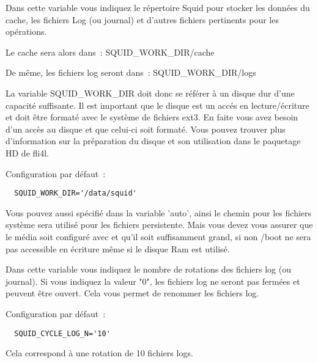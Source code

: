 \begin{description}

                Dans cette variable vous indiquez le répertoire Squid pour stocker
                les données du cache, les fichiers Log (ou journal) et d'autres
                fichiers pertinents pour les opérations.

                Le cache sera alors dans~:
                                SQUID\_WORK\_DIR/cache

                De même, les fichiers log seront dans~:
                                SQUID\_WORK\_DIR/logs

                La variable SQUID\_WORK\_DIR doit donc se référer à un disque
                dur d'une capacité suffisante. Il est important que le disque
                est un accés en lecture/écriture et doit être formaté avec le
                système de fichiers ext3. En faite vous avez besoin d'un accès
                au disque et que celui-ci soit formaté. Vous pouvez trouver plus
                d'information sur la préparation du disque et son utilisation
                dans le paquetage HD de fli4l.

                Configuration par défaut~:
\begin{verbatim}
  SQUID_WORK_DIR='/data/squid'
\end{verbatim}

                Vous pouvez aussi spécifié dans la variable 'auto', ainsi le
                chemin pour les fichiers système sera utilisé pour les fichiers
                persistente. Mais vous devez vous assurer que le média soit
                configuré avec  et qu'il soit suffisamment
                grand, si non /boot ne sera pas accessible en écriture même si
                le disque Ram est utilisé.



                Dans cette variable vous indiquez le nombre de rotations des
                fichiers log (ou journal). Si vous indiquez la valeur "0", les
                fichiers log ne seront pas fermées et peuvent être ouvert. Cela
                vous permet de renommer les fichiers log.

                Configuration par défaut~:
\begin{verbatim}
  SQUID_CYCLE_LOG_N='10'
\end{verbatim}

                Cela correspond à une rotation de 10 fichiers logs.



\end{description}
